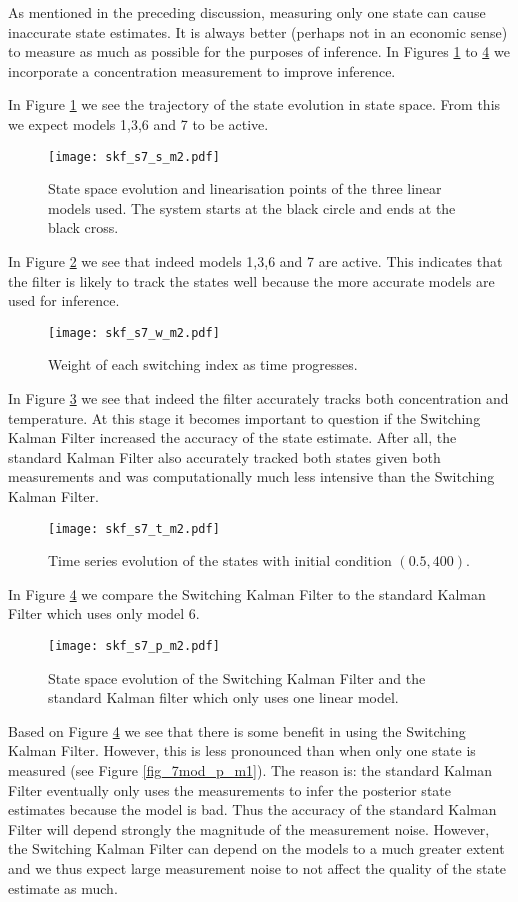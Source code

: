 As mentioned in the preceding discussion, measuring only one state can cause inaccurate state estimates. It is always better (perhaps not in an economic sense) to measure as much as possible for the purposes of inference. In Figures \ref{fig_7mod_ss_m2} to \ref{fig_7mod_p_m2} we incorporate a concentration measurement to improve inference. 

In Figure \ref{fig_7mod_ss_m2} we see the trajectory of the state evolution in state space. From this we expect models 1,3,6 and 7 to be active. 
\begin{figure}[H] 
\centering
\texttt{[image: skf\_s7\_s\_m2.pdf]}
\caption{State space evolution and linearisation points of the three linear models used. The system starts at the black circle and ends at the black cross.}
\label{fig_7mod_ss_m2}
\end{figure}
In Figure \ref{fig_7mod_w_m2} we see that indeed models 1,3,6 and 7 are active. This indicates that the filter is likely to track the states well because the more accurate models are used for inference.
\begin{figure}[H] 
\centering
\texttt{[image: skf\_s7\_w\_m2.pdf]}
\caption{Weight of each switching index as time progresses.}
\label{fig_7mod_w_m2}
\end{figure}
In Figure \ref{fig_7mod_t_m2} we see that indeed the filter accurately tracks both concentration and temperature. At this stage it becomes important to question if the Switching Kalman Filter increased the accuracy of the state estimate. After all, the standard Kalman Filter also accurately tracked both states given both measurements and was computationally much less intensive than the Switching Kalman Filter. 
\begin{figure}[H] 
\centering
\texttt{[image: skf\_s7\_t\_m2.pdf]}
\caption{Time series evolution of the states with initial condition $(0.5, 400)$.}
\label{fig_7mod_t_m2}
\end{figure}
In Figure \ref{fig_7mod_p_m2} we compare the Switching Kalman Filter to the standard Kalman Filter which uses only model 6.
\begin{figure}[H] 
\centering
\texttt{[image: skf\_s7\_p\_m2.pdf]}
\caption{State space evolution of the Switching Kalman Filter and the standard Kalman filter which only uses one linear model.}
\label{fig_7mod_p_m2}
\end{figure}
Based on Figure \ref{fig_7mod_p_m2} we see that there is some benefit in using the Switching Kalman Filter. However, this is less pronounced than when only one state is measured (see Figure \ref{fig_7mod_p_m1}). The reason is: the standard Kalman Filter eventually only uses the measurements to infer the posterior state estimates because the model is bad. Thus the accuracy of the standard Kalman Filter will depend strongly the magnitude of the measurement noise. However, the Switching Kalman Filter can depend on the models to a much greater extent and we thus expect large measurement noise to not affect the quality of the state estimate as much. 

